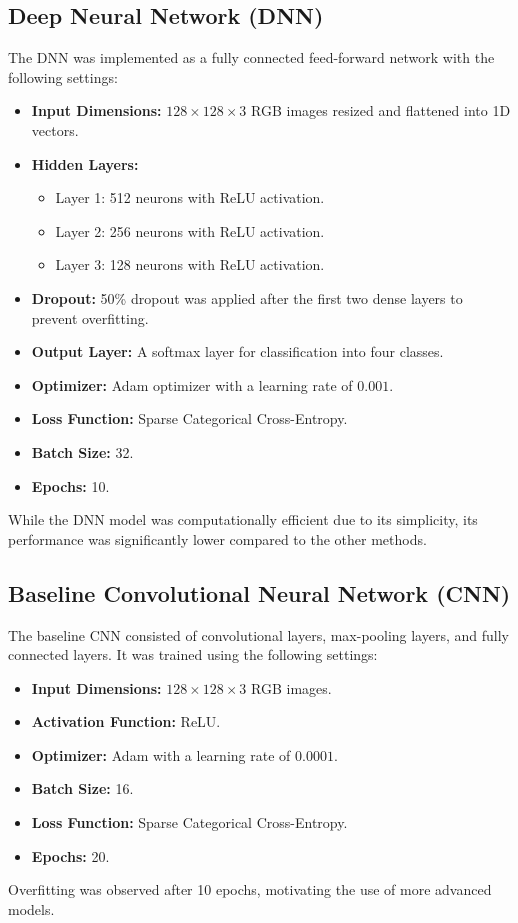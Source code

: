 \documentclass[runningheads]{llncs}
\begin{document}
\subsection{Deep Neural Network (DNN)}
The DNN was implemented as a fully connected feed-forward network with the following settings:
\begin{itemize}
    \item \textbf{Input Dimensions:} $128 \times 128 \times 3$ RGB images resized and flattened into 1D vectors.
    \item \textbf{Hidden Layers:}
          \begin{itemize}
              \item Layer 1: 512 neurons with ReLU activation.
              \item Layer 2: 256 neurons with ReLU activation.
              \item Layer 3: 128 neurons with ReLU activation.
          \end{itemize}
    \item \textbf{Dropout:} 50\% dropout was applied after the first two dense layers to prevent overfitting.
    \item \textbf{Output Layer:} A softmax layer for classification into four classes.
    \item \textbf{Optimizer:} Adam optimizer with a learning rate of $0.001$.
    \item \textbf{Loss Function:} Sparse Categorical Cross-Entropy.
    \item \textbf{Batch Size:} 32.
    \item \textbf{Epochs:} 10.
\end{itemize}
While the DNN model was computationally efficient due to its simplicity, its performance was significantly lower compared to the other methods.

\subsection{Baseline Convolutional Neural Network (CNN)}
The baseline CNN consisted of convolutional layers, max-pooling layers, and fully connected layers. It was trained using the following settings:
\begin{itemize}
    \item \textbf{Input Dimensions:} $128 \times 128 \times 3$ RGB images.
    \item \textbf{Activation Function:} ReLU.
    \item \textbf{Optimizer:} Adam with a learning rate of $0.0001$.
    \item \textbf{Batch Size:} 16.
    \item \textbf{Loss Function:} Sparse Categorical Cross-Entropy.
    \item \textbf{Epochs:} 20.
\end{itemize}
Overfitting was observed after 10 epochs, motivating the use of more advanced models.
\end{document}
